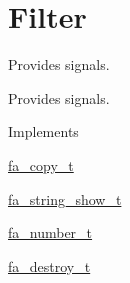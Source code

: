 \hypertarget{group___fa_signal_filter}{\section{Filter}
\label{group___fa_signal_filter}
}


Provides signals.  


Provides signals. \begin{DoxyParagraph}{Implements}

\begin{DoxyItemize}
\item \hyperlink{structfa__copy__t}{fa\-\_\-copy\-\_\-t}
\item \hyperlink{structfa__string__show__t}{fa\-\_\-string\-\_\-show\-\_\-t}
\item \hyperlink{structfa__number__t}{fa\-\_\-number\-\_\-t}
\item \hyperlink{structfa__destroy__t}{fa\-\_\-destroy\-\_\-t} 
\end{DoxyItemize}
\end{DoxyParagraph}
